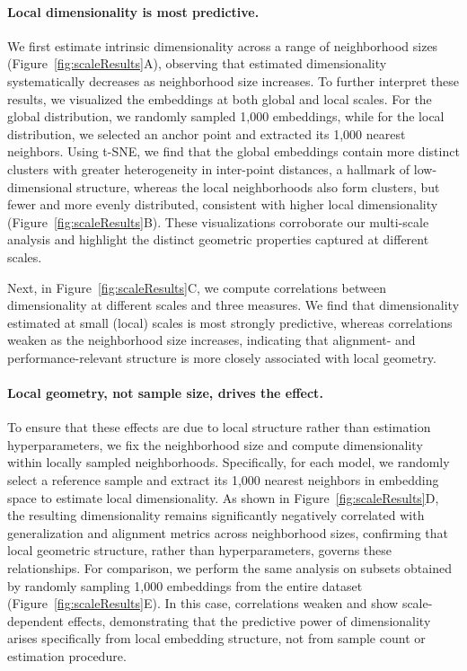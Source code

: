 \documentclass{article}
\theoremstyle{plain}
\theoremstyle{definition}
\theoremstyle{remark}
\begin{document}
\paragraph{Local dimensionality is most predictive.}
We first estimate intrinsic dimensionality across a range of neighborhood sizes (Figure~\ref{fig:scaleResults}A), observing that estimated dimensionality systematically decreases as neighborhood size increases. To further interpret these results, we visualized the embeddings at both global and local scales. For the global distribution, we randomly sampled 1,000 embeddings, while for the local distribution, we selected an anchor point and extracted its 1,000 nearest neighbors. Using t-SNE, we find that the global embeddings contain more distinct clusters with greater heterogeneity in inter-point distances, a hallmark of low-dimensional structure, whereas the local neighborhoods also form clusters, but fewer and more evenly distributed, consistent with higher local dimensionality (Figure~\ref{fig:scaleResults}B). These visualizations corroborate our multi-scale analysis and highlight the distinct geometric properties captured at different scales.

Next, in Figure~\ref{fig:scaleResults}C, we compute correlations between dimensionality at different scales and three measures.
We find that dimensionality estimated at small (local) scales is most strongly predictive, whereas correlations weaken as the neighborhood size increases, indicating that alignment- and performance-relevant structure is more closely associated with local geometry.


\paragraph{Local geometry, not sample size, drives the effect.}
To ensure that these effects are due to local structure rather than estimation hyperparameters, we fix the neighborhood size and compute dimensionality within locally sampled neighborhoods.
Specifically, for each model, we randomly select a reference sample and extract its 1,000 nearest neighbors in embedding space to estimate local dimensionality.
As shown in Figure~\ref{fig:scaleResults}D, the resulting dimensionality remains significantly negatively correlated with generalization and alignment metrics across neighborhood sizes, confirming that local geometric structure, rather than hyperparameters, governs these relationships.
For comparison, we perform the same analysis on subsets obtained by randomly sampling 1,000 embeddings from the entire dataset (Figure~\ref{fig:scaleResults}E).
In this case, correlations weaken and show scale-dependent effects, demonstrating that the predictive power of dimensionality arises specifically from local embedding structure, not from sample count or estimation procedure.
\end{document}
